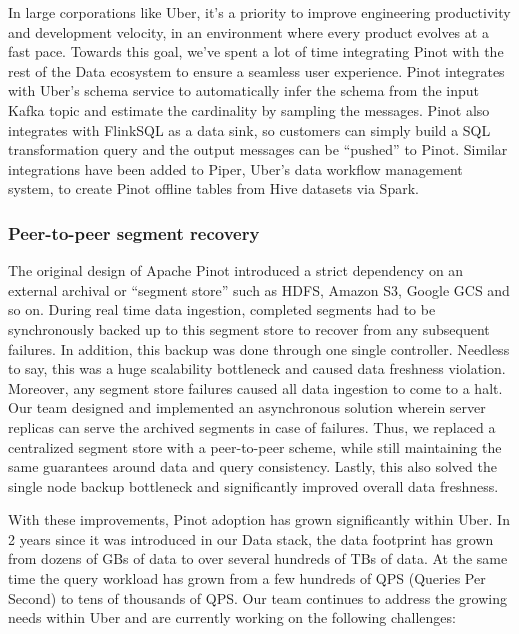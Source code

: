 \documentclass[sigconf]{acmart}
\begin{document}
In large corporations like Uber, it’s a priority to improve engineering productivity and development velocity, in an environment where every product evolves at a fast pace. Towards this goal, we’ve spent a lot of time integrating Pinot with the rest of the Data ecosystem to ensure a seamless user experience\cite{operate-pinot}. Pinot integrates with Uber’s schema service to automatically infer the schema from the input Kafka topic and estimate the cardinality by sampling the messages. Pinot also integrates with FlinkSQL as a data sink, so customers can simply build a SQL transformation query and the output messages can be “pushed” to Pinot. Similar integrations have been added to Piper, Uber’s data workflow management system\cite{piper}, to create Pinot offline tables from Hive datasets via Spark.

\subsubsection{Peer-to-peer segment recovery}

The original design of Apache Pinot introduced a strict dependency on an external archival or “segment store” such as HDFS, Amazon S3, Google GCS and so on. During real time data ingestion, completed segments had to be synchronously backed up to this segment store to recover from any subsequent failures. In addition, this backup was done through one single controller. Needless to say, this was a huge scalability bottleneck and caused data freshness violation. Moreover, any segment store failures caused all data ingestion to come to a halt. Our team designed and implemented an asynchronous solution wherein server replicas can serve the archived segments in case of failures. Thus, we replaced a centralized segment store with a peer-to-peer scheme, while still maintaining the same guarantees around data and query consistency. Lastly, this also solved the single node backup bottleneck and significantly improved overall data freshness. 

\bigskip

With these improvements, Pinot adoption has grown significantly within Uber. In 2 years since it was introduced in our Data stack, the data footprint has grown from dozens of GBs of data to over several hundreds of TBs of data. At the same time the query workload has grown from a few hundreds of QPS (Queries Per Second) to tens of thousands of QPS. Our team continues to address the growing needs within Uber and are currently working on the following challenges:
\end{document}
